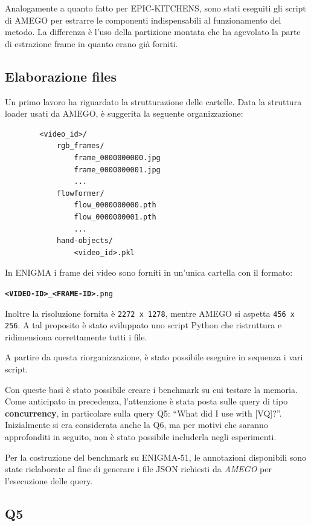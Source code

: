 Analogamente a quanto fatto per EPIC-KITCHENS, sono stati eseguiti gli script di AMEGO per estrarre le componenti indispensabili al funzionamento del metodo. La differenza è l'uso della partizione montata che ha agevolato la parte di estrazione frame in quanto erano già forniti.

\subsection*{Elaborazione files}
Un primo lavoro ha riguardato la strutturazione delle cartelle. Data la struttura loader usati da AMEGO, è suggerita la seguente organizzazione:
\begin{center}
    \begin{verbatim}
        <video_id>/
            rgb_frames/
                frame_0000000000.jpg
                frame_0000000001.jpg
                ...
            flowformer/
                flow_0000000000.pth
                flow_0000000001.pth
                ...
            hand-objects/
                <video_id>.pkl
    \end{verbatim}    
\end{center}

In ENIGMA i frame dei video sono forniti in un'unica cartella con il formato:
\begin{center}
\texttt{\textbf{<VIDEO-ID>}\_\textbf{<FRAME-ID>}.png}    
\end{center}
Inoltre la risoluzione fornita è \texttt{2272 x 1278}, mentre AMEGO si aspetta \texttt{456 x 256}. A tal proposito è stato sviluppato uno script Python che ristruttura e ridimensiona correttamente tutti i file.

A partire da questa riorganizzazione, è stato possibile eseguire in sequenza i vari script.

Con queste basi è stato possibile creare i benchmark su cui testare la memoria. Come anticipato in precedenza, l'attenzione è stata posta sulle query di tipo \textbf{concurrency}, in particolare sulla query Q5: ``What did I use with [VQ]?''. Inizialmente si era considerata anche la Q6, ma per motivi che saranno approfonditi in seguito, non è stato possibile includerla negli esperimenti.

Per la costruzione del benchmark su ENIGMA-51, le annotazioni disponibili sono state rielaborate al fine di generare i file JSON richiesti da \emph{AMEGO} per l'esecuzione delle query.

\subsection*{Q5}

